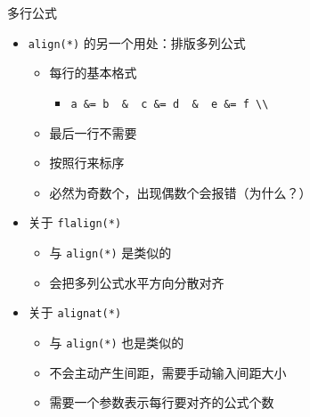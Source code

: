 \begin{frame}[fragile]{多行公式}
	\begin{itemize}
		\item \verb|align(*)| 的另一个用处：排版多列公式
		\begin{itemize}
			\item 每行的基本格式
			\begin{itemize}
				\item[] \verb|a &= b  &  c &= d  &  e &= f \\|
			\end{itemize}
			\item 最后一行不需要 \cprotect\fbox{\verb|\\|}
			\item 按照行来标序
			\item \cprotect\fbox{\verb|&|} 必然为奇数个，出现偶数个会报错（为什么？）
		\end{itemize}
		\item 关于 \verb|flalign(*)|
		\begin{itemize}
			\item 与 \verb|align(*)| 是类似的
			\item 会把多列公式水平方向分散对齐
		\end{itemize}
		\item 关于 \verb|alignat(*)|
		\begin{itemize}
			\item 与 \verb|align(*)| 也是类似的
			\item 不会主动产生间距，需要手动输入间距大小
			\item 需要一个参数表示每行要对齐的公式个数
		\end{itemize}
	\end{itemize}
\end{frame}

